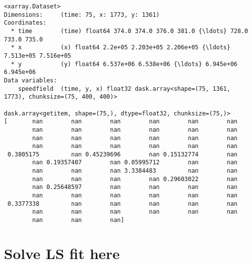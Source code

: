 \documentclass[11pt]{article}
\begin{document}
    \begin{Verbatim}[commandchars=\\\{\}]
<xarray.Dataset>
Dimensions:     (time: 75, x: 1773, y: 1361)
Coordinates:
  * time        (time) float64 374.0 374.0 376.0 381.0 {\ldots} 728.0 733.0 735.0
  * x           (x) float64 2.2e+05 2.203e+05 2.206e+05 {\ldots} 7.513e+05 7.516e+05
  * y           (y) float64 6.537e+06 6.538e+06 {\ldots} 6.945e+06 6.945e+06
Data variables:
    speedfield  (time, y, x) float32 dask.array<shape=(75, 1361, 1773), chunksize=(75, 400, 400)> 

dask.array<getitem, shape=(75,), dtype=float32, chunksize=(75,)>
[       nan        nan        nan        nan        nan        nan
        nan        nan        nan        nan        nan        nan
        nan        nan        nan        nan        nan        nan
        nan        nan        nan        nan        nan        nan
 0.3805175         nan 0.45239696        nan 0.15132774        nan
        nan 0.19357407        nan 0.05995712        nan        nan
        nan        nan        nan 3.3384483         nan        nan
        nan        nan        nan        nan 0.29603022        nan
        nan 0.25648597        nan        nan        nan        nan
        nan        nan        nan        nan        nan        nan
 0.3377338         nan        nan        nan        nan        nan
        nan        nan        nan        nan        nan        nan
        nan        nan        nan]

    \end{Verbatim}

    \hypertarget{solve-ls-fit-here}{%
\section{Solve LS fit here}\label{solve-ls-fit-here}}
\end{document}
